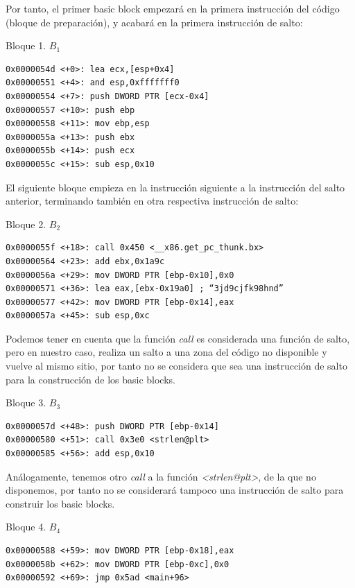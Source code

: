 \documentclass[12pt,twoside]{article}
\begin{document}
Por tanto, el primer basic block empezará en la primera instrucción del código (bloque de preparación), y acabará en la primera instrucción de salto:
\begin{center}
Bloque 1. $B_1$
\end{center}

\begin{verbatim}
0x0000054d <+0>: lea ecx,[esp+0x4]
0x00000551 <+4>: and esp,0xfffffff0
0x00000554 <+7>: push DWORD PTR [ecx-0x4]
0x00000557 <+10>: push ebp
0x00000558 <+11>: mov ebp,esp
0x0000055a <+13>: push ebx
0x0000055b <+14>: push ecx
0x0000055c <+15>: sub esp,0x10
\end{verbatim}

El siguiente bloque empieza en la instrucción siguiente a la instrucción del salto anterior, terminando también en otra respectiva instrucción de salto:
\begin{center}
Bloque 2. $B_2$
\end{center}
\begin{verbatim}
0x0000055f <+18>: call 0x450 <__x86.get_pc_thunk.bx>
0x00000564 <+23>: add ebx,0x1a9c
0x0000056a <+29>: mov DWORD PTR [ebp-0x10],0x0
0x00000571 <+36>: lea eax,[ebx-0x19a0] ; “3jd9cjfk98hnd”
0x00000577 <+42>: mov DWORD PTR [ebp-0x14],eax
0x0000057a <+45>: sub esp,0xc
\end{verbatim}

Podemos tener en cuenta que la función \textit{call} es considerada una función de salto, pero en nuestro caso, realiza un salto a una zona del código no disponible y vuelve al mismo sitio, por tanto no se considera que sea una instrucción de salto para la construcción de los basic blocks. 

\begin{center}
Bloque 3. $B_3$
\end{center}
\begin{verbatim}
0x0000057d <+48>: push DWORD PTR [ebp-0x14]
0x00000580 <+51>: call 0x3e0 <strlen@plt>
0x00000585 <+56>: add esp,0x10
\end{verbatim}

Análogamente, tenemos otro \textit{call} a la función \textit{<strlen@plt>}, de la que no disponemos, por tanto no se considerará tampoco una instrucción de salto para construir los basic blocks.

\begin{center}
Bloque 4. $B_4$
\end{center}
\begin{verbatim}
0x00000588 <+59>: mov DWORD PTR [ebp-0x18],eax
0x0000058b <+62>: mov DWORD PTR [ebp-0xc],0x0
0x00000592 <+69>: jmp 0x5ad <main+96>
\end{verbatim}
\end{document}

